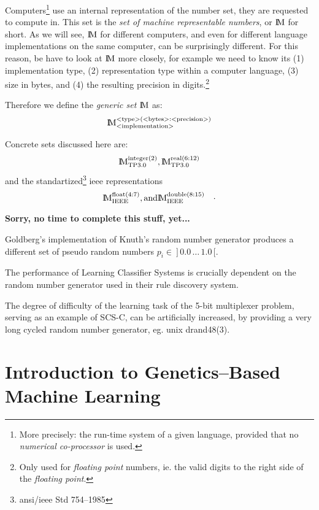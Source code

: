 Computers\footnote{%
More precisely: the run-time system of a given language, provided
that no {\em numerical co-processor\/} is used.}
use an internal representation of the number set, they
are requested to compute in. This set is the {\em set of machine
representable numbers\/}, or $\M$ for short. As we will see,
$\M$ for different computers, and even for different language
implementations on the same computer, can be surprisingly different.
For this reason, be have to look at $\M$ more closely, for example
we need to know its (1) implementation type, (2) representation
type within a computer language, (3) size in bytes, and (4) the
resulting precision in digits.\footnote{%
Only used for {\em floating point\/} numbers, ie. the valid digits
to the right side of the {\em floating point}.}

Therefore we define the {\em generic set} $\M$ as:
$$
	\Mgeneric
$$

Concrete sets discussed here are:
$$
	\Mtpi,
	\Mtpr
$$
and the standartized\footnote{%
{\sc ansi/ieee} Std 754--1985}
{\sc ieee} representations
$$
	\Mieeef, \mbox{and}
	\Mieeed
	\quad\cdot
$$

{\bf Sorry, no time to complete this stuff, yet...}

\begin{hype}
Goldberg's implementation of Knuth's random number generator produces
a different set of pseudo random numbers $p_i \in\ ]\, 0.0\,\ldots\,1.0\, [$.
\end{hype}

\begin{hype}
The performance of Learning Classifier Systems is crucially dependent on
the random number generator used in their rule discovery system.
\end{hype}

\begin{hype}
The degree of difficulty of the learning task of the 5-bit multiplexer
problem, serving as an example of SCS-C, can be artificially increased,
by providing a very long cycled random number generator, eg. {\sc unix}
drand48(3).
\end{hype}
\fi

\setcounter{chapter}{5}
\chapter[Introduction to GBML]{Introduction to Genetics--Based Machine Learning}

